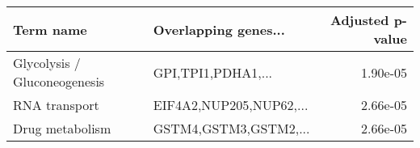\begin{tabular}{llr}
\toprule
                   Term name &    Overlapping genes... &  Adjusted p-value \\
\midrule
Glycolysis / Gluconeogenesis &      GPI,TPI1,PDHA1,... &          1.90e-05 \\
               RNA transport & EIF4A2,NUP205,NUP62,... &          2.66e-05 \\
             Drug metabolism &   GSTM4,GSTM3,GSTM2,... &          2.66e-05 \\
\bottomrule
\end{tabular}
